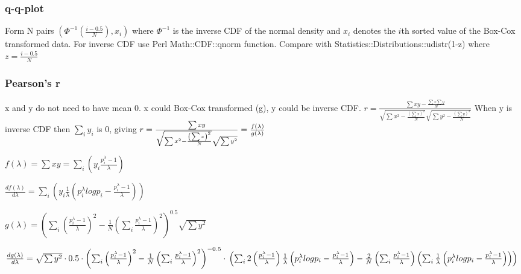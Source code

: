 \subsubsection*{q-q-plot}
Form N pairs
\begin{math}
\left(
\Phi^{-1}\left(\frac{i-0.5}{N}\right), x_i
\right)
\end{math}
where $\Phi^{-1}$ is the inverse CDF of the normal density and $x_i$ denotes the $i$th sorted value
of the Box-Cox transformed data.
For inverse CDF use Perl Math::CDF::qnorm function.
Compare with Statistics::Distributions::udistr(1-z) where $z=\frac{i-0.5}{N}$

\subsubsection*{Pearson's r}
x and y do not need to have mean 0. x could Box-Cox transformed (g), y could be inverse CDF.
\begin{math}
r=\frac{\sum{xy}-\frac{\sum{x}\sum{y}}{N}}
{\sqrt{\sum{x^2}-\frac{\left(\sum{x}\right)^2}{N}}\sqrt{\sum{y^2}-\frac{\left(\sum{y}\right)^2}{N}}}
\end{math}
When y is inverse CDF then $\sum_iy_i$ is 0, giving 
\begin{math}
r=\frac{\sum{xy}}
{\sqrt{\sum{x^2}-\frac{\left(\sum{x}\right)^2}{N}}\sqrt{\sum{y^2}}}\\
=\frac{f(\lambda)}{g(\lambda)}
\end{math}

\begin{math}
f(\lambda)=\sum{xy}=\sum_i \left(y_i\frac{p_i^{\lambda}-1}{\lambda}\right)
\end{math}

\begin{math}
\frac{df(\lambda)}{d\lambda}
=\sum_i\left(y_i\frac{1}{\lambda}\left(p_i^{\lambda}log{p_i}-\frac{p_i^{\lambda}-1}{\lambda}\right)\right)
\end{math}


\begin{math}
g(\lambda)=
\left(\sum_i\left(\frac{p_i^{\lambda}-1}{\lambda}\right)^2-\frac{1}{N}\left(\sum_i \frac{p_i^{\lambda}-1}{\lambda}\right)^2  \right)^{0.5} 
\sqrt{\sum{y^2}}
\end{math}

\begin{math}
\frac{dg(\lambda)}{d\lambda}=
\sqrt{\sum{y^2}}\cdot
0.5\cdot\left(\sum_i\left(\frac{p_i^{\lambda}-1}{\lambda}\right)^2-\frac{1}{N}\left(\sum_i \frac{p_i^{\lambda}-1}{\lambda}\right)^2  \right)^{-0.5} 
\cdot\\
\left(
\sum_i2\left(\frac{p_i^{\lambda}-1}{\lambda} \right)\frac{1}{\lambda}\left(p_i^{\lambda}log{p_i}-\frac{p_i^{\lambda}-1}{\lambda}\right)
-\frac{2}{N}\left(\sum_i \frac{p_i^{\lambda}-1}{\lambda}\right) \left(\sum_i \frac{1}{\lambda}\left(p_i^{\lambda}log{p_i}-\frac{p_i^{\lambda}-1}{\lambda}\right) \right)
\right)
\end{math}


